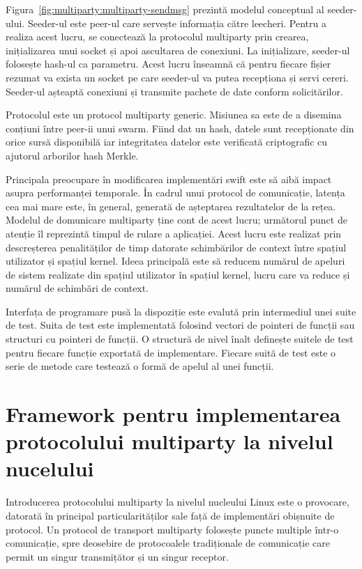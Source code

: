 Figura~\ref{fig:multiparty:multiparty-sendmsg} prezintă modelul conceptual al
seeder-ului. Seeder-ul este peer-ul care servește informația către leecheri.
Pentru a realiza acest lucru, se conectează la protocolul multiparty prin
crearea, inițializarea unui socket și apoi ascultarea de conexiuni. La
inițializare, seeder-ul folosește hash-ul ca parametru. Acest lucru înseamnă
că pentru fiecare fișier rezumat va exista un socket pe care seeder-ul va
putea recepționa și servi cereri. Seeder-ul așteaptă conexiuni și transmite
pachete de date conform solicitărilor.

Protocolul este un protocol multiparty generic. Misiunea sa este de a disemina
conțiuni între peer-ii unui swarm. Fiind dat un hash, datele sunt recepționate
din orice sursă disponibilă iar integritatea datelor este verificată
criptografic cu ajutorul arborilor hash Merkle.

Principala preocupare în modificarea implementări swift este să aibă impact
asupra performanței temporale. În cadrul unui protocol de comunicație, latența
cea mai mare este, în general, generată de așteptarea rezultatelor de la
rețea. Modelul de domunicare multiparty ține cont de acest lucru; următorul
punct de atenție îl reprezintă timpul de rulare a aplicației. Acest lucru este
realizat prin descreșterea penalităților de timp datorate schimbărilor de
context între spațiul utilizator și spațiul kernel. Ideea principală este să
reducem numărul de apeluri de sistem realizate din spațiul utilizator în
spațiul kernel, lucru care va reduce și numărul de schimbări de context.

Interfața de programare pusă la dispoziție este evalută prin intermediul unei
suite de test. Suita de test este implementată folosind vectori de pointeri de
funcții sau structuri cu pointeri de funcții.  O structură de nivel înalt
definește suitele de test pentru fiecare funcție exportată de implementare.
Fiecare suită de test este o serie de metode care testează o formă de apelul
al unei funcții.

\section{Framework pentru implementarea protocolului multiparty la nivelul
nucelului}
\label{sec:multiparty:kernel-framework}

Introducerea protocolului multiparty la nivelul nucleului Linux este o
provocare, datorată în principal particularităților sale față de implementări
obișnuite de protocol. Un protocol de transport multiparty folosește puncte
multiple într-o comunicație, spre deosebire de protocoalele tradiționale de
comunicație care permit un singur transmițător și un singur receptor.

